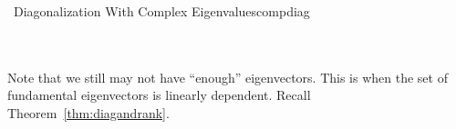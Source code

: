 \begin{example}{\Difficulty\,\Difficulty\,\,Diagonalization With Complex Eigenvalues}{compdiag}
        \end{example}
        \vphantom
        \\
        \\
        Note that we still may not have ``enough'' eigenvectors. This is when the set of fundamental eigenvectors is linearly dependent. Recall Theorem~\ref{thm:diagandrank}.